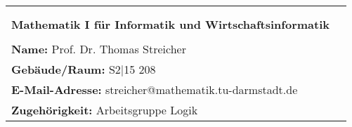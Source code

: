 \begin{tabular}{lc}
                                                                   & \\&               \\
    \textbf{Mathematik I für Informatik und Wirtschaftsinformatik}
    & \multirow{4}{*}{} \\
                                                                   &                   \\
    \textbf{Name:} Prof. Dr. Thomas Streicher                      &                   \\
    \textbf{Gebäude/Raum:} S2$|$15 208                             &                   \\
    \textbf{E-Mail-Adresse:} streicher@mathematik.tu-darmstadt.de  &                   \\
    \textbf{Zugehörigkeit:} Arbeitsgruppe Logik                    &                   \\
\end{tabular}

\newpage
